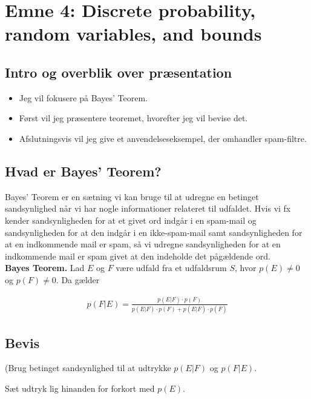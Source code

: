 \documentclass[12pt]{article}
\begin{document}
\newpage


\section{Emne 4: Discrete probability, random variables, and bounds}

\subsection*{Intro og overblik over præsentation}

\begin{itemize}
    \item Jeg vil fokusere på Bayes' Teorem. 
    \item Først vil jeg præsentere teoremet, hvorefter jeg vil bevise det. 
    \item Afslutningsvis vil jeg give et anvendelseseksempel, der omhandler spam-filtre.
\end{itemize}

\subsection*{Hvad er Bayes' Teorem?}

Bayes' Teorem er en sætning vi kan bruge til at udregne en betinget sandsynlighed når vi har nogle informationer relateret til udfaldet. Hvis vi fx kender sandsynligheden for at et givet ord indgår i en spam-mail og sandsynligheden for at den indgår i en ikke-spam-mail samt sandsynligheden for at en indkommende mail er spam, så vi udregne sandsynligheden for at en indkommende mail er spam givet at den indeholde det pågældende ord. \\

\textbf{Bayes Teorem.} Lad $E$ og $F$ være udfald fra et udfaldsrum $S$, hvor $p(E) \ne 0$ og $p(F) \ne 0$. Da gælder

\begin{align*}
    p(F|E) = \frac{p(E|F) \cdot p(F)}{p(E|F) \cdot p(F) + p(E| \overline{F})\cdot p(\overline{F})}
\end{align*}

\subsection*{Bevis}

(Brug betinget sandsynlighed til at udtrykke $p(E|F)$ og $p(F|E)$. 

Sæt udtryk lig hinanden for forkort med $p(E)$.
\end{document}

